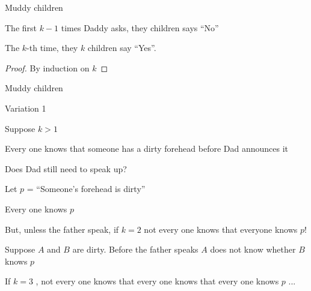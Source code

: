 \begin{frame}{Muddy children}
\begin{theorem}
\BI
\item The first $k-1$ times Daddy asks, they children says “No”
\item The $k$-th time, they $k$ children say “Yes”.
\EI
\end{theorem}

\begin{proof}
By induction on $k$
\end{proof}


\end{frame}

\begin{frame}{Muddy children}
\begin{block}{Variation 1}
\BI
\item Suppose $k>1$
\item Every one knows that someone has a dirty forehead before Dad announces it
\item Does Dad still need to speak up?
\EI
\end{block}

\pause
\BI
\item Let $p$ = “Someone’s forehead is dirty” 
\item Every one knows $p$
\item But, unless the father speak, if $k = 2$ not every one knows that everyone knows $p$!
\item Suppose $A$ and $B$ are dirty. Before the father speaks $A$ does not know whether $B$ knows $p$
\item If $k = 3$ , not every one knows that every one knows that every one knows $p$ ...
\EI


\end{frame}

